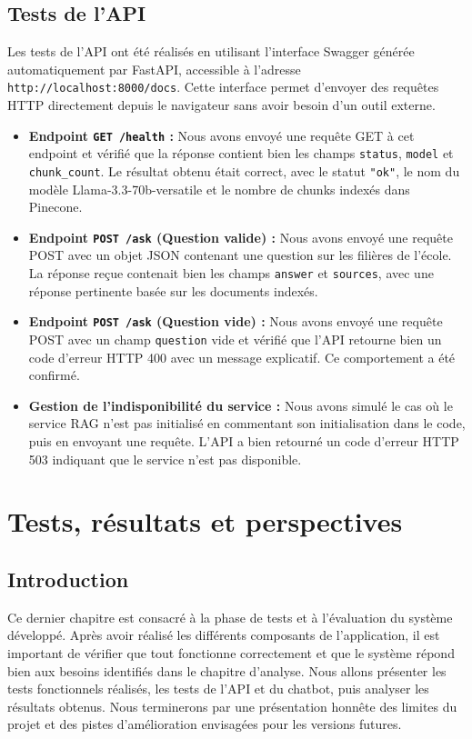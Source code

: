 \documentclass[12pt, a4paper, twoside]{report}
\begin{document}
\section{Tests de l'API}
Les tests de l'API ont été réalisés en utilisant l'interface Swagger générée automatiquement par FastAPI, accessible à l'adresse \texttt{http://localhost:8000/docs}. Cette interface permet d'envoyer des requêtes HTTP directement depuis le navigateur sans avoir besoin d'un outil externe.

\begin{itemize}[label=\bullet]
    \item \textbf{Endpoint \texttt{GET /health} :} Nous avons envoyé une requête GET à cet endpoint et vérifié que la réponse contient bien les champs \texttt{status}, \texttt{model} et \texttt{chunk\_count}. Le résultat obtenu était correct, avec le statut \texttt{"ok"}, le nom du modèle Llama-3.3-70b-versatile et le nombre de chunks indexés dans Pinecone.
    \item \textbf{Endpoint \texttt{POST /ask} (Question valide) :} Nous avons envoyé une requête POST avec un objet JSON contenant une question sur les filières de l'école. La réponse reçue contenait bien les champs \texttt{answer} et \texttt{sources}, avec une réponse pertinente basée sur les documents indexés.
    \item \textbf{Endpoint \texttt{POST /ask} (Question vide) :} Nous avons envoyé une requête POST avec un champ \texttt{question} vide et vérifié que l'API retourne bien un code d'erreur HTTP 400 avec un message explicatif. Ce comportement a été confirmé.
    \item \textbf{Gestion de l'indisponibilité du service :} Nous avons simulé le cas où le service RAG n'est pas initialisé en commentant son initialisation dans le code, puis en envoyant une requête. L'API a bien retourné un code d'erreur HTTP 503 indiquant que le service n'est pas disponible.
\end{itemize}
\chapter{Tests, résultats et perspectives}

\section{Introduction}
Ce dernier chapitre est consacré à la phase de tests et à l'évaluation du système développé. Après avoir réalisé les différents composants de l'application, il est important de vérifier que tout fonctionne correctement et que le système répond bien aux besoins identifiés dans le chapitre d'analyse. Nous allons présenter les tests fonctionnels réalisés, les tests de l'API et du chatbot, puis analyser les résultats obtenus. Nous terminerons par une présentation honnête des limites du projet et des pistes d'amélioration envisagées pour les versions futures.
\end{document}
